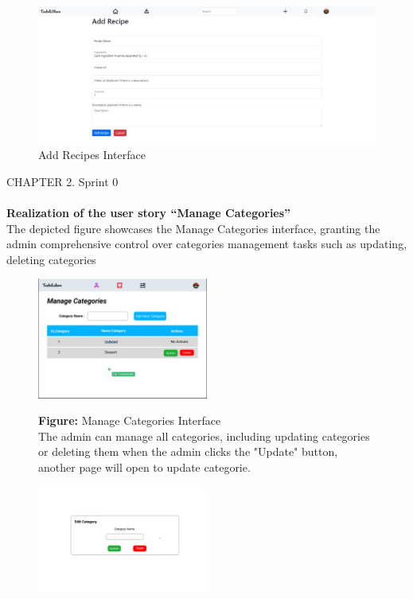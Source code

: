 \documentclass{article}
\begin{document}
{{{\begin{figure}[htbp]
    \centering
    \includegraphics[width=1\textwidth]{addpic}
    \caption{Add Recipes Interface}
    \label{fig:design2}
\end{figure}
\newpage
\noindent
CHAPTER 2.  Sprint 0 \\
\underline{\hspace{\textwidth}} \vspace{0.2cm}
\\\textbf{Realization of the user story “Manage Categories”}\\
The depicted figure showcases the Manage Categories interface, granting the admin comprehensive control over categories management tasks such as updating, deleting categories\\
\begin{figure}[htbp]
    \centering
    \includegraphics[width=0.5\textwidth]{manegecat2} 
    \vspace{0.5cm}
    
    \textbf{Figure:} Manage Categories Interface \\
    The admin can manage all categories, including updating categories  or deleting them when the admin clicks the "Update" button, another page will open to update categorie.
\end{figure}


\begin{figure}[htbp]
    \centering
    \includegraphics[width=0.5\textwidth]{editcat} 
    \vspace{0.5cm}
    

\end{figure}}}}
\end{document}
